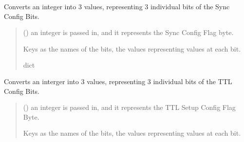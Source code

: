 \documentclass[letterpaper,10pt,english]{sphinxmanual}
\begin{document}
\begin{fulllineitems}
\begin{fulllineitems}
\label{\detokenize{PodDevice_8480SC:PodDevice_8480SC.POD_8480SC.DecodeSyncConfigBits}}
\pysigstartsignatures
{}
\pysigstopsignatures
\sphinxAtStartPar
Converts an integer into 3 values, representing 3 individual bits of the Sync Config Bits.
\begin{quote}\begin{description}
\sphinxAtStartPar
{} () \textendash{} an integer is passed in, and it represents the Sync Config Flag byte.

\sphinxAtStartPar
Keys as the names of the bits, the values representing values at each bit.

\sphinxAtStartPar
dict

\end{description}\end{quote}

\end{fulllineitems}


\begin{fulllineitems}
\label{\detokenize{PodDevice_8480SC:PodDevice_8480SC.POD_8480SC.DecodeTTlConfigBits}}
\pysigstartsignatures
{}
\pysigstopsignatures
\sphinxAtStartPar
Converts an interger into 3 values, representing 3 individual bits of the TTL Config Bits.
\begin{quote}\begin{description}
\sphinxAtStartPar
{} () \textendash{} an integer is passed in, and it represents the TTL Setup Config Flag Byte.

\sphinxAtStartPar
Keys as the names of the bits, the values representing values at each bit.


\end{description}
\end{quote}
\end{fulllineitems}
\end{fulllineitems}
\end{document}
